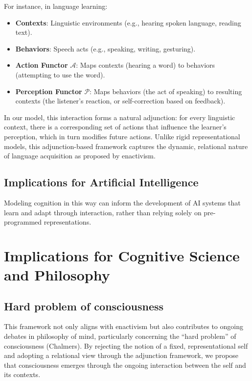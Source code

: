\documentclass{article}
\begin{document}
For instance, in language learning:

\begin{itemize}
    \item \textbf{Contexts}: Linguistic environments (e.g., hearing spoken language, reading text).
    \item \textbf{Behaviors}: Speech acts (e.g., speaking, writing, gesturing).
    \item \textbf{Action Functor} $\mathcal{A}$: Maps contexts (hearing a word) to behaviors (attempting to use the word).
    \item \textbf{Perception Functor} $\mathcal{P}$: Maps behaviors (the act of speaking) to resulting contexts (the listener’s reaction, or self-correction based on feedback).
\end{itemize}

In our model, this interaction forms a natural adjunction: for every linguistic context, there is a corresponding set of actions that influence the learner's perception, which in turn modifies future actions. Unlike rigid representational models, this adjunction-based framework captures the dynamic, relational nature of language acquisition as proposed by enactivism.

\subsection{Implications for Artificial Intelligence}

Modeling cognition in this way can inform the development of AI systems that learn and adapt through interaction, rather than relying solely on pre-programmed representations.

\section{Implications for Cognitive Science and Philosophy}

\subsection{Hard problem of consciousness}
This framework not only aligns with enactivism but also contributes to ongoing debates in philosophy of mind, particularly concerning the ``hard problem'' of consciousness (Chalmers). By rejecting the notion of a fixed, representational self and adopting a relational view through the adjunction framework, we propose that consciousness emerges through the ongoing interaction between the self and its contexts.
\end{document}
